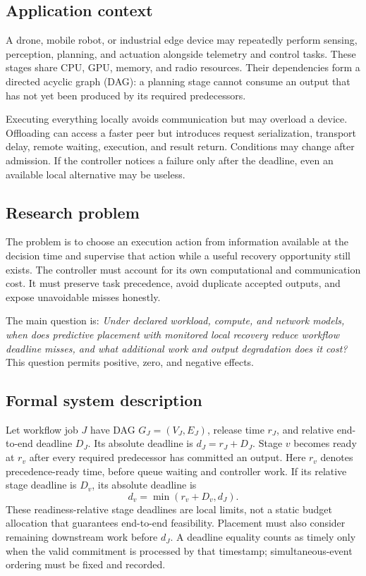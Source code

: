 \documentclass[11pt,a4paper]{article}
\begin{document}
\subsection{Application context}
A drone, mobile robot, or industrial edge device may repeatedly perform sensing,
perception, planning, and actuation alongside telemetry and control tasks.
These stages share CPU, GPU, memory, and radio resources. Their dependencies
form a directed acyclic graph (DAG): a planning stage cannot consume an output
that has not yet been produced by its required predecessors.

Executing everything locally avoids communication but may overload a device.
Offloading can access a faster peer but introduces request serialization,
transport delay, remote waiting, execution, and result return. Conditions may
change after admission. If the controller notices a failure only after the
deadline, even an available local alternative may be useless.

\subsection{Research problem}
The problem is to choose an execution action from information available at the
decision time and supervise that action while a useful recovery opportunity
still exists. The controller must account for its own computational and
communication cost. It must preserve task precedence, avoid duplicate accepted
outputs, and expose unavoidable misses honestly.

The main question is: \emph{Under declared workload, compute, and network models,
when does predictive placement with monitored local recovery reduce workflow
deadline misses, and what additional work and output degradation does it cost?}
This question permits positive, zero, and negative effects.

\subsection{Formal system description}
Let workflow job $J$ have DAG $G_J=(V_J,E_J)$, release time $r_J$, and relative
end-to-end deadline $D_J$. Its absolute deadline is $d_J=r_J+D_J$. Stage $v$
becomes ready at $r_v$ after every required predecessor has committed an output.
Here $r_v$ denotes precedence-ready time, before queue waiting and controller
work. If its relative stage deadline is $D_v$, its absolute deadline is
\begin{equation}
 d_v=\min(r_v+D_v,d_J).
\end{equation}
These readiness-relative stage deadlines are local limits, not a static budget
allocation that guarantees end-to-end feasibility. Placement must also consider
remaining downstream work before $d_J$. A deadline equality counts as timely only
when the valid commitment is processed by that timestamp; simultaneous-event
ordering must be fixed and recorded.
\end{document}
